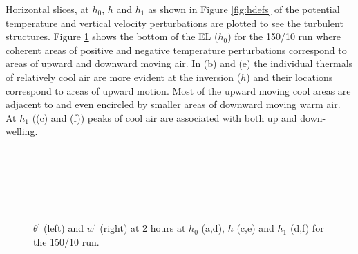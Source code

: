 Horizontal slices, at $h_{0}$, $h$ and $h_{1}$ as shown in Figure \ref{fig:hdefs} of the potential temperature 
and vertical velocity perturbations are plotted to see the turbulent structures.  Figure \ref{fig:conts} shows the bottom of the \acs{EL} ($h_{0}$) for the 150/10 run where coherent areas of positive and negative temperature perturbations 
correspond to areas of upward and downward moving air.  In (b) and (e) the individual thermals of relatively cool air are more evident at the inversion ($h$) and their locations correspond to areas of upward motion.  Most of the upward moving cool areas are adjacent to and even 
encircled by smaller areas of downward moving warm air.  At $h_{1}$ ((c) and (f)) peaks of cool air are associated 
with both up and down-welling.\\  

\begin{figure}[htbp]
\caption[2D horizontal slices of $\theta^{'}$ and $w^{'}$]{$\theta^{'}$ (left) and $w^{'}$ (right) at 2 hours at $h_{0}$ (a,d), $h$ (c,e) and $h_{1}$ (d,f) for the 150/10 run.} 
\begin{minipage}[b]{0.5\linewidth}  
        \\
        \\ 
 \end{minipage}             
\quad
\begin{minipage}[b]{0.5\linewidth}
        \\
       
       \\
        
\end{minipage}        
        \label{fig:conts}
\end{figure}

